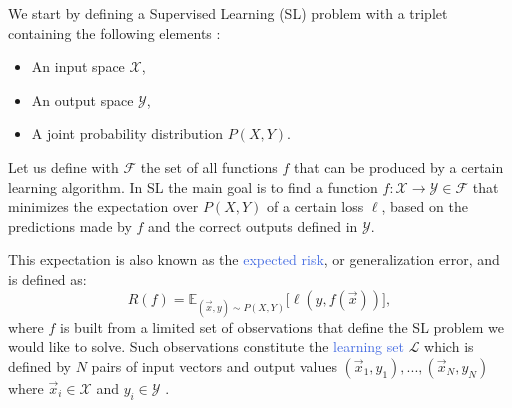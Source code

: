 We start by defining a Supervised Learning (SL) problem with a triplet containing the following elements \cite{friedman2001elements, louppe2014understanding}:
\begin{itemize}
	\item An input space $\mathcal{X}$,
	\item An output space $\mathcal{Y}$,
	\item A joint probability distribution $P(X,Y)$.
\end{itemize}
Let us define with $\mathcal{F}$ the set of all functions $f$ that can be produced by a certain learning algorithm. In SL the main goal is to find a function $f:\mathcal{X}\rightarrow\mathcal{Y} \in \mathcal{F}$ that minimizes the expectation over $P(X,Y)$ of a certain loss $\ell$, based on the predictions made by $f$ and the correct outputs defined in $\mathcal{Y}$.

This expectation is also known as the \textcolor{RoyalBlue}{expected risk}, or generalization error, and is defined as:
\begin{equation}
	R(f) = \mathds{E}_{(\vec{x},y)\sim P(X,Y)} \big[\ell(y,f(\vec{x}))\big],
\label{eq:expected_risk}
\end{equation}
where $f$ is built from a limited set of observations that define the SL problem we would like to solve. Such observations constitute the \textcolor{RoyalBlue}{learning set} $\mathcal{L}$ which is defined by $N$ pairs of input vectors and output values $(\vec{x}_1, y_1),...,(\vec{x}_N, y_N)$ where $\vec{x}_i \in \mathcal{X}$ and $y_i \in \mathcal{Y}$ \cite{geurts2002contributions}. 

